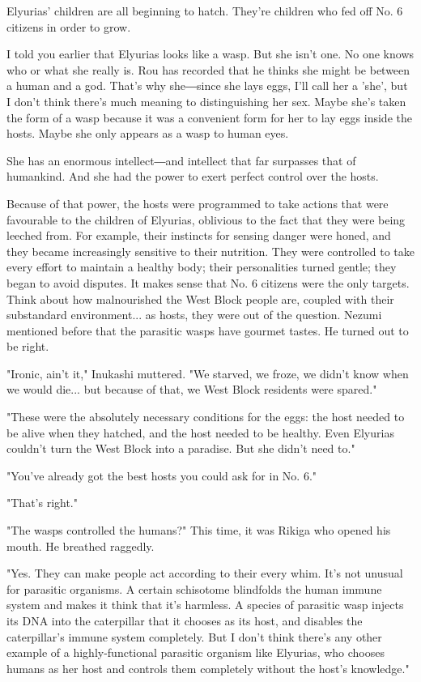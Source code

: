Elyurias' children are all beginning to hatch. They're children who fed
off No. 6 citizens in order to grow.

I told you earlier that Elyurias looks like a wasp. But she isn't one.
No one knows who or what she really is. Rou has recorded that he thinks
she might be between a human and a god. That's why she―since she lays
eggs, I'll call her a 'she', but I don't think there's much meaning to
distinguishing her sex. Maybe she's taken the form of a wasp because it
was a convenient form for her to lay eggs inside the hosts. Maybe she
only appears as a wasp to human eyes.

She has an enormous intellect―and intellect that far surpasses that of
humankind. And she had the power to exert perfect control over the
hosts.

Because of that power, the hosts were programmed to take actions that
were favourable to the children of Elyurias, oblivious to the fact that
they were being leeched from. For example, their instincts for sensing
danger were honed, and they became increasingly sensitive to their
nutrition. They were controlled to take every effort to maintain a
healthy body; their personalities turned gentle; they began to avoid
disputes. It makes sense that No. 6 citizens were the only targets.
Think about how malnourished the West Block people are, coupled with
their substandard environment... as hosts, they were out of the
question. Nezumi mentioned before that the parasitic wasps have gourmet
tastes. He turned out to be right.

"Ironic, ain't it," Inukashi muttered. "We starved, we froze, we didn't
know when we would die... but because of that, we West Block residents
were spared."

"These were the absolutely necessary conditions for the eggs: the host
needed to be alive when they hatched, and the host needed to be healthy.
Even Elyurias couldn't turn the West Block into a paradise. But she
didn't need to."

"You've already got the best hosts you could ask for in No. 6."

"That's right."

"The wasps controlled the humans?" This time, it was Rikiga who opened
his mouth. He breathed raggedly.

"Yes. They can make people act according to their every whim. It's not
unusual for parasitic organisms. A certain schisotome blindfolds the
human immune system and makes it think that it's harmless. A species of
parasitic wasp injects its DNA into the caterpillar that it chooses as
its host, and disables the caterpillar's immune system completely. But I
don't think there's any other example of a highly-functional parasitic
organism like Elyurias, who chooses humans as her host and controls them
completely without the host's knowledge."

